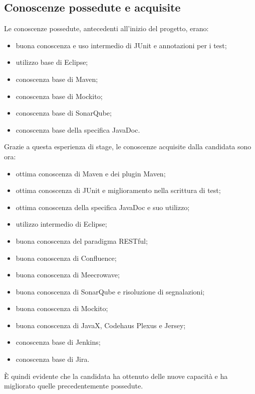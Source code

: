     \clearpage

    \subsection{Conoscenze possedute e acquisite}
    Le conoscenze possedute, antecedenti all'inizio del progetto, erano:
    \begin{itemize}
        \item buona conoscenza e uso intermedio di JUnit e annotazioni per i test;
        \item utilizzo base di Eclipse;
        \item conoscenza base di Maven;
        \item conoscenza base di Mockito;
        \item conoscenza base di SonarQube;
        \item conoscenza base della specifica JavaDoc.
    \end{itemize}
    Grazie a questa esperienza di stage, le conoscenze acquisite dalla candidata sono ora:
    \begin{itemize}
        \item ottima conoscenza di Maven e dei plugin Maven;
        \item ottima conoscenza di JUnit e miglioramento nella scrittura di test;
        \item ottima conoscenza della specifica JavaDoc e suo utilizzo;
        \item utilizzo intermedio di Eclipse;
        \item buona conoscenza del paradigma RESTful;
        \item buona conoscenza di Confluence;
        \item buona conoscenza di Meecrowave;
        \item buona conoscenza di SonarQube e risoluzione di segnalazioni;
        \item buona conoscenza di Mockito;
        \item buona conoscenza di JavaX, Codehaus Plexus e Jersey;
        \item conoscenza base di Jenkins;
        \item conoscenza base di Jira.
    \end{itemize}
    È quindi evidente che la candidata ha ottenuto delle nuove capacità e ha migliorato quelle precedentemente possedute.

